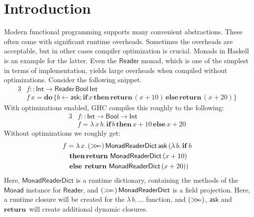 \documentclass[acmsmall,screen,review,anonymous]{acmart}
\newcommand{\msf}[1]{\mathsf{#1}}
\newcommand{\mbf}[1]{\mathbf{#1}}
\newcommand{\mdo}{\mbf{do}\,}
\newcommand{\ind}{\hspace{1em}}
\newcommand{\bif}{\mbf{if}\,}
\newcommand{\bthen}{\mbf{then}\,}
\newcommand{\belse}{\mbf{else}\,}
\newcommand{\return}{\mbf{return}\,}
\newcommand{\lam}{\lambda\,}
\newcommand{\Int}{\msf{Int}}
\newcommand{\Reader}{\msf{Reader}}
\newcommand{\Monad}{\msf{Monad}}
\newcommand{\Bool}{\msf{Bool}}
\newcommand{\fro}{\leftarrow}
\newcommand{\bind}{\mathbin{>\!\!>\mkern-6.7mu=}}
\theoremstyle{remark}
\begin{document}


\maketitle


\section{Introduction}\label{sec:introduction}

Modern functional programming supports many convenient abstractions. These often
come with significant runtime overheads. Sometimes the overheads are acceptable,
but in other cases compiler optimization is crucial. Monads in Haskell is an
example for the latter. Even the $\Reader$ monad, which is one of the simplest
in terms of implementation, yields large overheads when compiled without
optimizations. Consider the following snippet.
\begin{alignat*}{3}
  &f :: \Int \to \Reader\,\Bool\,\Int \\
  &f\,x = \mdo\{b \fro \msf{ask}; \bif x\, \bthen \return (x + 10)\, \belse \return (x + 20)\}
\end{alignat*}
With optimizations enabled, GHC compiles this roughly to the following:
\begin{alignat*}{3}
  &f :: \Int \to \Bool \to \Int \\
  &f = \lam x\,b.\, \bif b\, \bthen x + 10\, \belse x + 20
\end{alignat*}
Without optimizations we roughly get:
\begin{alignat*}{3}
  &f = \lam x.\,(\bind)\,\msf{MonadReaderDict}\,\msf{ask}\,(\lam b.\,\bif b\\
  &\ind \bthen\return\,\msf{MonadReaderDict}\,(x + 10)\\
  &\ind \belse\hspace{0.25em}\return\,\msf{MonadReaderDict}\,(x + 20))
\end{alignat*}
Here, $\msf{MonadReaderDict}$ is a runtime dictionary, containing the methods of
the $\Monad$ instance for $\Reader$, and $(\bind)\,\msf{MonadReaderDict}$ is a
field projection. Here, a runtime closure will be created for the $\lam b.\,...$
function, and $(\bind)$, $\msf{ask}$ and $\return$ will create additional dynamic
closures.
\end{document}
